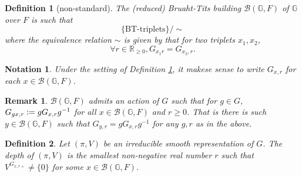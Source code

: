 \documentclass[10pt]{article}
\newtheorem{definition}{Definition}[section]
\newtheorem{notation}{Notation}[section]
\newtheorem{remark}{Remark}[section]
\numberwithin{equation}{theorem}
\newcommand{\defeq}{\vcentcolon=}
\newcommand{\bR}[0]{\mathbb{R}}
\newcommand{\G}[0]{\mathbb{G}}
\newcommand{\BT}[0]{\mathrm{BT}}
\begin{document}
\begin{definition}[non-standard]
    \label{definition_4_1}
    The (reduced) Bruaht-Tits building $\mathcal{B}(\G,F)$ of $\G$ over $F$ is such that 
    \begin{equation*}
        \{\text{$\BT$-triplets}\}/\sim
    \end{equation*}
    where the equivalence relation $\sim$ is given by that for two triplets $x_1,x_2$, 
    \begin{equation*}
        \forall r\in\bR_{\geq 0}, G_{x_1r}=G_{x_2,r}.
    \end{equation*}
\end{definition}

\begin{notation}
    Under the setting of Definition \ref{definition_4_1}, it makese sense to write $G_{x,r}$ for each $x\in\mathcal{B}(\G,F)$.
\end{notation}

\begin{remark}
    $\mathcal{B}(\G,F)$ admits an action of $G$ such that for $g\in G$, $G_{gx,r} \defeq gG_{x,r}g^{-1}$ for all $x\in\mathcal{B}(\G,F)$ and $r\geq0$.
    That is there is such $y\in\mathcal{B}(\G,F)$ such that $G_{y,r} = gG_{x,r}g^{-1}$ for any $g,r$ as in the above.
\end{remark}

\begin{definition}
    Let $(\pi,V)$ be an irreducible smooth representation of $G$. The depth of $(\pi,V)$ is the smallest non-negative real number $r$ such that $V^{G_{x,r+}}\not=\{0\}$ for some $x\in\mathcal{B}(\G,F)$.
\end{definition}
\end{document}

